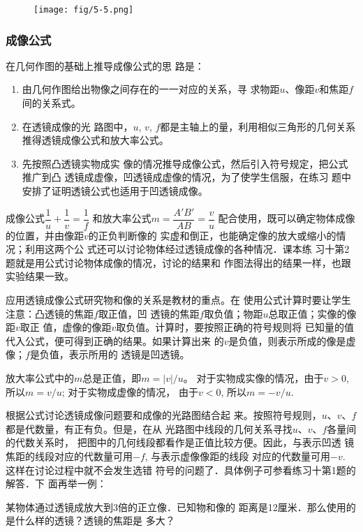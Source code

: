 \begin{figure}[htp]
    \centering
    \texttt{[image: fig/5-5.png]}
    \caption{}
\end{figure}

\subsubsection{成像公式}

在几何作图的基础上推导成像公式的思
路是：
\begin{enumerate}
\item 由几何作图给出物像之间存在的一一对应的关系，寻
求物距$u$、像距$v$和焦距$f$间的关系式。
\item 在透镜成像的光
路图中，$u$, $v$, $f$都是主轴上的量，利用相似三角形的几何关系
推得透镜成像公式和放大率公式。
\item 先按照凸透镜实物成实
像的情况推导成像公式，然后引入符号规定，把公式推广到凸
透镜成虚像，凹透镜成虚像的情况，为了使学生信服，在练习
题中安排了证明透镜公式也适用于凹透镜成像。
\end{enumerate}

成像公式$\dfrac{1}{u}+\dfrac{1}{v}=\dfrac{1}{f}$
和放大率公式$m=\dfrac{A'B'}{AB}=\dfrac{v}{u}$
配合使用，既可以确定物体成像的位置，并由像距$v$的正负判断像的
实虚和倒正，也能确定像的放大或缩小的情况；利用这两个公
式还可以讨论物体经过透镜成像的各种情况．课本练
习十第2题就是用公式讨论物体成像的情况，讨论的结果和
作图法得出的结果一样，也跟实验结果一致。

应用透镜成像公式研究物和像的关系是教材的重点。在
使用公式计算时要让学生注意：凸透镜的焦距$f$取正值，凹
透镜的焦距$f$取负值；物距$u$总取正值；实像的像距$v$取正
值，虚像的像距$v$取负值。计算时，要按照正确的符号规则将
已知量的值代入公式，便可得到正确的结果。如果计算出来
的$v$是负值，则表示所成的像是虚像；$f$是负值，表示所用的
透镜是凹透镜。

放大率公式中的$m$总是正值，即$m=|v|/u$。
对于实物成实像的情况，由于$v>0$, 所以$m=v/u$; 对于实物成虚像的情况，
由于$v<0$, 所以$m=-v/u$. 

根据公式讨论透镜成像问题要和成像的光路图结合起
来。按照符号规则，$u$、$v$、$f$都是代数量，有正有负。但是，在从
光路图中线段的几何关系寻找$u$、$v$、$f$各量间的代数关系时，
把图中的几何线段都看作是正值比较方便。因此，与表示凹透
镜焦距的线段对应的代数量可用$-f$, 与表示虚像像距的线段
对应的代数量可用$-v$. 这样在讨论过程中就不会发生选错
符号的问题了．具体例子可参看练习十第1题的解答．下
面再举一例：

某物体通过透镜成放大到3倍的正立像．已知物和像的
距离是12厘米．那么使用的是什么样的透镜？透镜的焦距是
多大？

